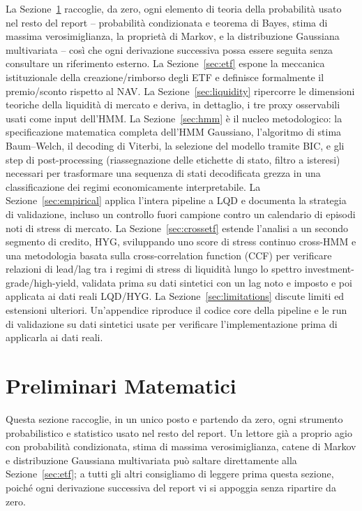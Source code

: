 \documentclass[11pt]{article}
\theoremstyle{definition}
\theoremstyle{remark}
\begin{document}
La Sezione~\ref{sec:prelim} raccoglie, da zero, ogni elemento di teoria della probabilit\`a usato nel resto del report -- probabilit\`a condizionata e teorema di Bayes, stima di massima verosimiglianza, la propriet\`a di Markov, e la distribuzione Gaussiana multivariata -- cos\`i che ogni derivazione successiva possa essere seguita senza consultare un riferimento esterno. La Sezione~\ref{sec:etf} espone la meccanica istituzionale della creazione/rimborso degli ETF e definisce formalmente il premio/sconto rispetto al NAV. La Sezione~\ref{sec:liquidity} ripercorre le dimensioni teoriche della liquidit\`a di mercato e deriva, in dettaglio, i tre proxy osservabili usati come input dell'HMM. La Sezione~\ref{sec:hmm} \`e il nucleo metodologico: la specificazione matematica completa dell'HMM Gaussiano, l'algoritmo di stima Baum--Welch, il decoding di Viterbi, la selezione del modello tramite BIC, e gli step di post-processing (riassegnazione delle etichette di stato, filtro a isteresi) necessari per trasformare una sequenza di stati decodificata grezza in una classificazione dei regimi economicamente interpretabile. La Sezione~\ref{sec:empirical} applica l'intera pipeline a LQD e documenta la strategia di validazione, incluso un controllo fuori campione contro un calendario di episodi noti di stress di mercato. La Sezione~\ref{sec:crossetf} estende l'analisi a un secondo segmento di credito, HYG, sviluppando uno score di stress continuo cross-HMM e una metodologia basata sulla cross-correlation function (CCF) per verificare relazioni di lead/lag tra i regimi di stress di liquidit\`a lungo lo spettro investment-grade/high-yield, validata prima su dati sintetici con un lag noto e imposto e poi applicata ai dati reali LQD/HYG. La Sezione~\ref{sec:limitations} discute limiti ed estensioni ulteriori. Un'appendice riproduce il codice core della pipeline e le run di validazione su dati sintetici usate per verificare l'implementazione prima di applicarla ai dati reali.

\section{Preliminari Matematici}
\label{sec:prelim}

Questa sezione raccoglie, in un unico posto e partendo da zero, ogni strumento probabilistico e statistico usato nel resto del report. Un lettore gi\`a a proprio agio con probabilit\`a condizionata, stima di massima verosimiglianza, catene di Markov e distribuzione Gaussiana multivariata pu\`o saltare direttamente alla Sezione~\ref{sec:etf}; a tutti gli altri consigliamo di leggere prima questa sezione, poich\'e ogni derivazione successiva del report vi si appoggia senza ripartire da zero.
\end{document}
